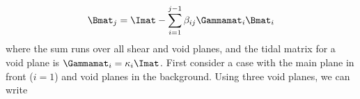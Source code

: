 \begin{equation}
\label{eq:Bold}
  \Bmat_j = \Imat - \sum_{i=1}^{j-1} \beta_{ij} \Gammamat_i \Bmat_i
\end{equation}
where the sum runs over all shear and void planes, and the tidal matrix for a void plane is $\Gammamat_i = \kappa_i \Imat$.  First consider a case with the main plane in front ($i=1$) and void planes in the background.  Using three void planes, we can write